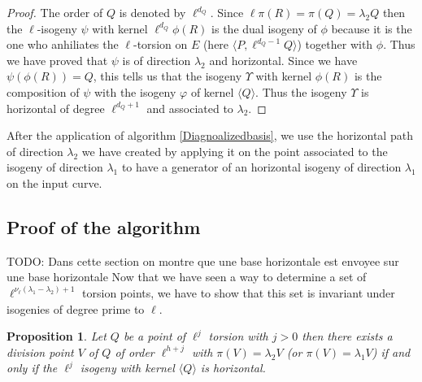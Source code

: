 \documentclass{lms}
\newcommand{\todo}[1]{{\color{red}TODO: #1}}
\newtheorem{prop}[thm]{Proposition}
\begin{document}
\begin{proof}
The order of $Q$ is denoted by $\ell^{d_Q}$. Since $\ell \pi(R)=\pi(Q)=\lambda_2Q$ then the $\ell$-isogeny $\psi$ with kernel $\ell^{d_Q}\phi(R)$ is the dual isogeny of $\phi$ because it is the one who anhiliates the $\ell$-torsion on $E$ (here $\langle P, \ell^{d_Q-1}Q \rangle$) together with $\phi$. Thus we have proved that $\psi$ is of direction $\lambda_2$ and horizontal. 
\newline
Since we have $\psi(\phi(R))=Q$, this tells us that the isogeny $\Upsilon$ with kernel $\phi(R)$ is the composition of $\psi$ with the isogeny $\varphi$ of kernel $\langle Q \rangle$. Thus the isogeny $\Upsilon$ is horizontal of degree $\ell^{d_Q+1}$ and associated to $\lambda_2$. 
\end{proof}

After the application of algorithm \ref{Diagnoalizedbasis}, we use the horizontal path of direction $\lambda_2$ we have created by applying it on the point associated to the isogeny of direction $\lambda_1$ to have a generator of an horizontal isogeny of direction $\lambda_1$ on the input curve.%


\subsection{Proof of the algorithm}
\todo{Dans cette section on montre que une base horizontale est envoyee sur une base horizontale}
Now that we have seen a way to determine a set of $\ell^{\nu_{\ell}(\lambda_1-\lambda_2)+1}$ torsion points, we have to show that this set is invariant under isogenies of degree prime to $\ell$.

\begin{prop}
Let $Q$ be a point of $\ell^j$ torsion with $j>0$ then there exists a division point $V$ of $Q$ of order $\ell^{h+j}$ with $\pi(V)=\lambda_2V$ (or $\pi(V)=\lambda_1V$) if and only if the $\ell^j$ isogeny with kernel $\langle Q \rangle $ is horizontal.
\end{prop}
\end{document}
